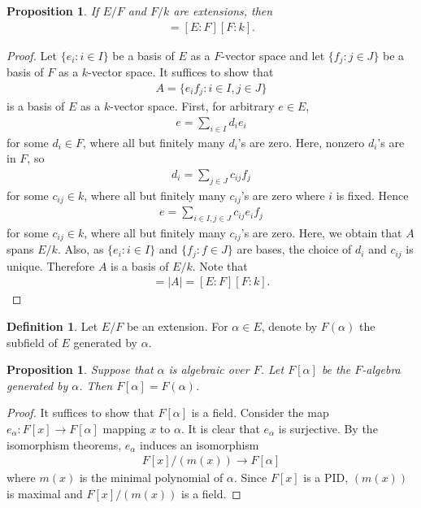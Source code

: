 \documentclass[12pt]{report}
\theoremstyle{plain}
\newtheorem{proposition}[theorem]{Proposition}
\theoremstyle{remark}
\theoremstyle{definition}
\newtheorem{definition}[theorem]{Definition}
\begin{document}
\begin{proposition}\label{Proposition 3.1.11.}
    If $E/F$ and $F/k$ are extensions, then
    \begin{align*}
        [E:k]=[E:F][F:k].
    \end{align*}
\end{proposition}
\begin{proof}
    Let $\{e_i:i\in I\}$ be a basis of $E$ as a $F$-vector space and let $\{f_j:j\in J\}$ be a basis of $F$ as a $k$-vector space. It suffices to show that
    \begin{align*}
        A = \{e_if_j:i\in I,j\in J\}
    \end{align*}
    is a basis of $E$ as a $k$-vector space. First, for arbitrary $e\in E$,
    \begin{align*}
        e=\sum_{i\in I} d_ie_i
    \end{align*}
    for some $d_i\in F$, where all but finitely many $d_i$'s are zero. Here, nonzero $d_i$'s are in $F$, so
    \begin{align*}
        d_i = \sum_{j\in J}c_{ij}f_j
    \end{align*}
    for some $c_{ij}\in k$, where all but finitely many $c_{ij}$'s are zero where $i$ is fixed. Hence
    \begin{align*}
        e = \sum_{i\in I,j\in J} c_{ij}e_if_j
    \end{align*}
    for some $c_{ij}\in k$, where all but finitely many $c_{ij}$'s are zero. Here, we obtain that $A$ spans $E/k$. Also, as $\{e_i:i\in I\}$ and $\{f_j:f\in J\}$ are bases, the choice of $d_i$ and $c_{ij}$ is unique. Therefore $A$ is a basis of $E/k$. Note that
    \begin{align*}
        [E:k] = |A| = [E:F][F:k].
    \end{align*}
\end{proof}

\begin{definition}
    Let $E/F$ be an extension. For $\alpha\in E$, denote by $F(\alpha)$ the subfield of $E$ generated by $\alpha$.
\end{definition}

\begin{proposition}
    Suppose that $\alpha$ is algebraic over $F$. Let $F[\alpha]$ be the $F$-algebra generated by $\alpha$. Then $F[\alpha]=F(\alpha)$.
\end{proposition}
\begin{proof}
    It suffices to show that $F[\alpha]$ is a field. Consider the map $e_\alpha:F[x]\rightarrow F[\alpha]$ mapping $x$ to $\alpha$. It is clear that $e_\alpha$ is surjective. By the isomorphism theorems, $e_\alpha$ induces an isomorphism
    \begin{align*}
        F[x]/(m(x))\rightarrow F[\alpha]
    \end{align*}
    where $m(x)$ is the minimal polynomial of $\alpha$. Since $F[x]$ is a PID, $(m(x))$ is maximal and $F[x]/(m(x))$ is a field.
\end{proof}
\end{document}
